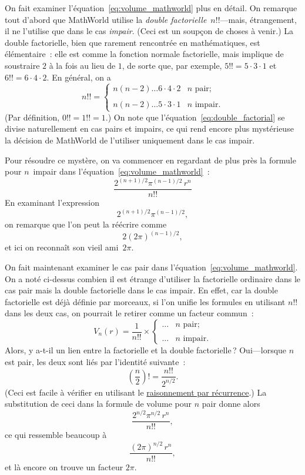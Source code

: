 On fait examiner l'équation~\eqref{eq:volume_mathworld} plus en détail. On remarque tout d'abord que MathWorld utilise la \emph{double factorielle}~$n!!$---mais, étrangement, il ne l'utilise que dans le cas \emph{impair}. (Ceci est un soupçon de choses à venir.) La double factorielle, bien que rarement rencontrée en mathématiques, est élémentaire~: elle est comme la fonction normale factorielle, mais implique de soustraire $2$ à la fois au lieu de $1$, de sorte que, par exemple, $5!! = 5 \cdot 3 \cdot 1$ et $6!! = 6 \cdot 4 \cdot 2$. En général, on a
\begin{equation}
\label{eq:double_factorial}
n!! = \begin{cases}
n(n-2)\ldots6\cdot4\cdot2 & n \text{ pair}; \\ \\
n(n-2)\ldots5\cdot3\cdot1 & n \text{ impair}.
\end{cases}
\end{equation}
(Par définition, $0!! =1!! = 1$.) On note que l'équation~\eqref{eq:double_factorial} se divise naturellement en cas pairs et impairs, ce qui rend encore plus mystérieuse la décision de MathWorld de l'utiliser uniquement dans le cas impair.

Pour résoudre ce mystère, on va commencer en regardant de plus près la formule pour $n$~impair dans l'équation~\eqref{eq:volume_mathworld}~:
\[ \frac{2^{(n+1)/2}\pi^{(n-1)/2}\,r^n}{n!!} \]
En examinant l'expression
\[ 2^{(n+1)/2}\pi^{(n-1)/2}, \]
on remarque que l'on peut la réécrire comme
\[ 2(2\pi)^{(n-1)/2}, \]
et ici on reconnaît son vieil ami~$2\pi$.

On fait maintenant examiner le cas pair dans l'équation~\eqref{eq:volume_mathworld}. On a noté ci-dessus combien il est étrange d'utiliser la factorielle ordinaire dans le cas pair mais la double factorielle dans le cas impair. En effet, car la double factorielle est déjà définie par morceaux, si l'on unifie les formules en utilisant $n!!$ dans les deux cas, on pourrait le retirer comme un facteur commun~:
\[
V_n(r) = \frac{1}{n!!}\times \begin{cases}
\ldots & n \text{ pair}; \\ \\
 \ldots & n \text{ impair}.
 \end{cases}
\]
Alors, y a-t-il un lien entre la factorielle et la double factorielle\,? Oui---lorsque $n$ est pair, les deux sont liés par l'identité suivante~:
\[ \left(\frac{n}{2}\right)! = \frac{n!!}{2^{n/2}}. \]
(Ceci est facile à vérifier en utilisant le \href{https://fr.wikipedia.org/wiki/Raisonnement_par_récurrence}{raisonnement par récurrence}.) La substitution de ceci dans la formule de volume pour $n$ pair donne alors
\[ \frac{2^{n/2}\pi^{n/2}\,r^n}{n!!}, \]
ce qui ressemble beaucoup à
\[ \frac{(2\pi)^{n/2}\,r^n}{n!!}, \]
et là encore on trouve un facteur $2\pi$.

